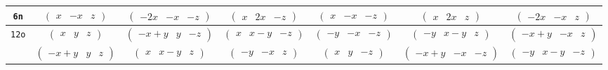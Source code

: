 \documentclass[fleqn,9pt,landscape]{jsarticle}
\begin{document}
\begin{center}
\begin{longtable}{ccccccc}
{\tt 6n} & $ \begin{pmatrix} x & - x & z \end{pmatrix} $ & $ \begin{pmatrix} - 2 x & - x & - z \end{pmatrix} $ & $ \begin{pmatrix} x & 2 x & - z \end{pmatrix} $ & $ \begin{pmatrix} x & - x & - z \end{pmatrix} $ & $ \begin{pmatrix} x & 2 x & z \end{pmatrix} $ & $ \begin{pmatrix} - 2 x & - x & z \end{pmatrix} $ \\ \hline
{\tt 12o} & $ \begin{pmatrix} x & y & z \end{pmatrix} $ & $ \begin{pmatrix} - x + y & y & - z \end{pmatrix} $ & $ \begin{pmatrix} x & x - y & - z \end{pmatrix} $ & $ \begin{pmatrix} - y & - x & - z \end{pmatrix} $ & $ \begin{pmatrix} - y & x - y & z \end{pmatrix} $ & $ \begin{pmatrix} - x + y & - x & z \end{pmatrix} $ \\
& $ \begin{pmatrix} - x + y & y & z \end{pmatrix} $ & $ \begin{pmatrix} x & x - y & z \end{pmatrix} $ & $ \begin{pmatrix} - y & - x & z \end{pmatrix} $ & $ \begin{pmatrix} x & y & - z \end{pmatrix} $ & $ \begin{pmatrix} - x + y & - x & - z \end{pmatrix} $ & $ \begin{pmatrix} - y & x - y & - z \end{pmatrix} $ \\
\end{longtable}
\end{center}
\end{document}
